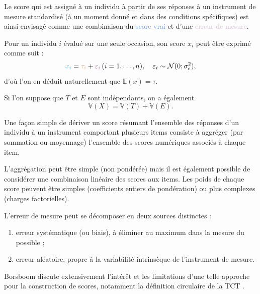 Le \textcolor{Apricot}{score} qui est assigné à un individu à partir de ses
réponses à un instrument de mesure standardisé (à un moment donné et dans des
conditions spécifiques) est ainsi envisagé comme une combinaison du
\textcolor{CornflowerBlue}{score vrai} et d'une \textcolor{Thistle}{erreur de
  mesure}.




Pour un individu $i$ évalué sur une seule occasion, son score $x_i$ peut être
exprimé comme suit : 
\[
\textcolor{CornflowerBlue}{x_i} = \textcolor{Apricot}{\tau_i} +
\textcolor{Thistle}{\varepsilon_i}\, (i=1,\dots,n),\quad \varepsilon_i\sim\mathcal{N}(0;\sigma_e^2),
\]
d'où l'on en déduit naturellement que $\mathbb{E}(x)=\tau$.

Si l'on suppose que $T$ et $E$ sont indépendants, on a également
\[
\mathbb{V}(X) = \mathbb{V}(T)+\mathbb{V}(E).
\]


Une façon simple de dériver un score résumant l'ensemble des réponses d'un
individu à un instrument comportant plusieurs items consiste à aggréger (par
sommation ou moyennage) l'ensemble des scores numériques associés à chaque item.

L'aggrégation peut être simple (non pondérée) mais il est également possible de
considérer une combinaison linéaire des scores aux items. Les poids de chaque
score peuvent être simples (coefficients entiers de pondération) ou plus
complexes (charges factorielles).


L'erreur de mesure peut se décomposer en deux sources distinctes :
\begin{enumerate}
\item erreur systématique (ou biais), à éliminer au maximum dans la mesure du
  possible ; 
\item erreur aléatoire, propre à la variabilité intrinsèque de l'instrument de
  mesure. 
\end{enumerate}

Borsboom discute extensivement l'intérêt et les limitations d'une telle approche
pour la construction de scores, notamment la définition circulaire de la TCT \autocite{Borsboom2006,Borsboom2005}.



